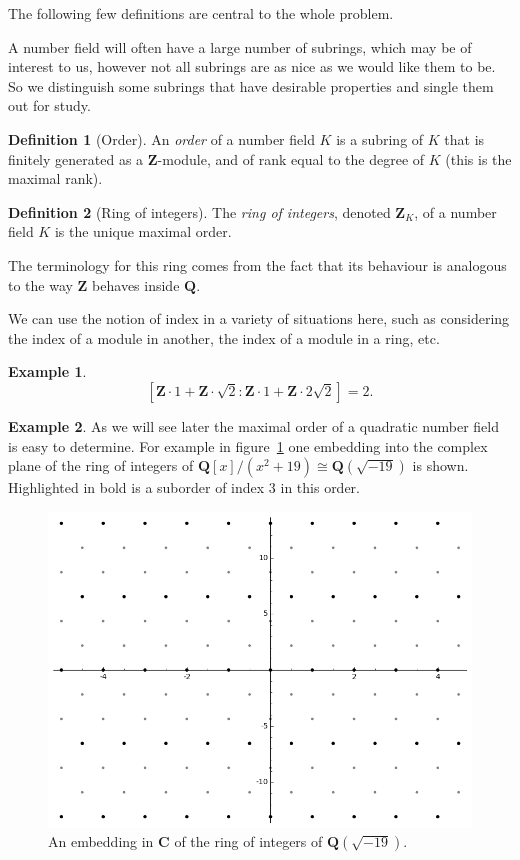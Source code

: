 \documentclass[a4paper,abstracton,bibtotoc]{scrreprt}
\theoremstyle{definition}
\newtheorem{defn}{Definition}
\newtheorem{ex}{Example}
\newcommand{\QQ}{\mathbf{Q}}
\newcommand{\CC}{\mathbf{C}}
\newcommand{\ZZ}{\mathbf{Z}}
\begin{document}
\minisec{}
The following few definitions are central to the whole problem.

A number field will often have a large number of subrings, which may be of interest to us, however not all subrings are as nice as we would like them to be.
So we distinguish some subrings that have desirable properties and single them out for study.

\begin{defn}[Order]
An \emph{order} of a number field $K$ is a subring of $K$ that is finitely generated as a $\ZZ$-module, and of rank equal to the degree of $K$ (this is the maximal rank).
\end{defn}


\begin{defn}[Ring of integers]
The \emph{ring of integers}, denoted $\ZZ_K$, of a number field $K$ is the unique maximal order.
\end{defn}

The terminology for this ring comes from the fact that its behaviour is analogous to the way $\ZZ$ behaves inside $\QQ$.

We can use the notion of index in a variety of situations here, such as considering the index of a module in another, the index of a module in a ring, etc. %

\begin{ex}
\[
[\ZZ\cdot 1 + \ZZ\cdot \sqrt{2} : \ZZ \cdot 1 + \ZZ \cdot 2\sqrt{2}] = 2.
\]
\end{ex}

\begin{ex}%
As we will see later the maximal order of a quadratic number field is easy to determine.
For example in figure~\ref{fig:sageord} one embedding into the complex plane of the ring of integers of $\QQ[x]/(x^2 + 19)\cong \QQ(\sqrt{-19})$ is shown.
Highlighted in bold is a suborder of index 3 in this order.
\begin{figure}
\centering
\includegraphics[scale=0.6]{sageord}
\caption{\label{fig:sageord} An embedding in $\CC$ of the ring of integers of $\QQ(\sqrt{-19})$.}
\end{figure}
\end{ex}
\end{document}
